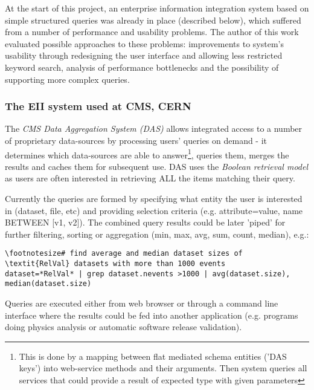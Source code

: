 At the start of this project, an enterprise information integration system based on simple structured queries was already in place (described below), which suffered from a number of performance and usability problems. %
The author of this work evaluated possible approaches to these problems: improvements to system's usability through redesigning the user interface and allowing less restricted keyword search, analysis of performance bottlenecks {\color{red}and the possibility of supporting more complex queries}.



\subsubsection*{The EII system used at CMS, CERN}

The \textit{CMS Data Aggregation System (DAS)}\cite{Kuznetsov2010, Kuznetsov2011} allows integrated access to a number of proprietary data-sources by processing users' queries on demand - it determines which  data-sources are able to answer\footnote{This is done by a mapping between flat mediated schema entities ('DAS keys') into web-service methods and their arguments. Then system queries all services that could provide a result of expected type with given parameters}, queries them, merges the results and caches them for subsequent use. DAS uses the \textit{Boolean retrieval model} as users are often interested in retrieving ALL the items matching their query.

Currently the queries are formed by specifying what entity the user is interested in (dataset, file, etc) and providing selection criteria (e.g. attribute=value, name BETWEEN [v1, v2]). The combined query results could be later 'piped' for further filtering, sorting or aggregation (min, max, avg, sum, count, median), e.g.:

{\small 
\begin{Verbatim}[commandchars=\\\{\}]
\footnotesize# find average and median dataset sizes of \textit{RelVal} datasets with more than 1000 events
dataset=*RelVal* | grep dataset.nevents >1000 | avg(dataset.size), median(dataset.size)
\end{Verbatim}
}

Queries are executed either from web browser or through a command line interface where the results could be fed into another application (e.g. programs doing physics analysis or automatic software release validation).

